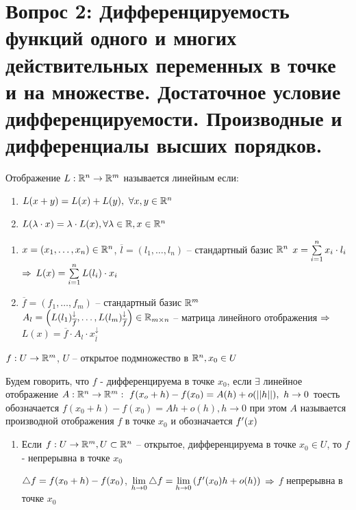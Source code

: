 \section{Вопрос 2: Дифференцируемость функций одного и многих действительных переменных
в точке и на множестве. Достаточное условие дифференцируемости.
Производные и дифференциалы высших порядков.}



\begin{defs}
	Отображение $L: \mathbb{R}^n\to\mathbb{R}^m$ называется линейным если:
	\begin{enumerate}
		\item $L(x+y)= L(x) + L(y), \ \forall x,y \in \mathbb{R}^n$
		\item $L(\lambda \cdot x) = \lambda \cdot L(x), \forall
		\lambda \in \mathbb{R},  x\in \mathbb{R}^n$
	\end{enumerate}

	\begin{enumerate}
		\item $x = (x_1, \ldots, x_n) \in \mathbb{R}^n$, $\overline{l} = (l_1,\ldots,l_n)$ -- стандартный базис $\mathbb{R}^n$ $x = \sum\limits_{i=1}^{n}x_i \cdot l_i$ $\Rightarrow$ $L(x) = \sum\limits_{i=1}^{n}L(l_i)\cdot x_i$

		\item $\overline{f}= (f_1,\ldots,f_m)$ -- стандартный базис $\mathbb{R}^m$ $A_l = \left( L(l_1)^{\downarrow}_{\overline{f}},\ldots,L(l_m)^{\downarrow}_{\overline{f}}\right) \in \mathbb{R}_{m \times n}$ -- матрица линейного отображения $\Rightarrow$ $L(x) = \overline{f} \cdot A_l \cdot x_{\overline{l}}^{\downarrow}$
	\end{enumerate}
\end{defs}

\begin{defs}
	$f: U \to \mathbb{R}^m$, $U$ -- открытое подмножество в $\mathbb{R}^n, x_0 \in U$

	Будем говорить, что $f$ - дифференцируема в точке $x_0$, если $\exists$ линейное отображение $A: \mathbb{R}^n \to \mathbb{R}^m: \ f(x_o + h) - f(x_0)= A(h) + o(\left|\left| h\right|\right|), \ h \to 0$ тоесть обозначается $f(x_0 + h)-f(x_0)=Ah+o(h), h\to 0$ при этом $A$ называется производной отображения $f$ в точке $x_0$ и обозначается $f^{\prime}(x)$
\end{defs}

\begin{claim}
	\begin{enumerate}
		\item Если $f: U \to \mathbb{R}^m, U \subset \mathbb{R}^n$ -- открытое, дифференцируема в точке $x_0 \in U$, то $f$ - непрерывна в точке $x_0$
		\begin{dokvo}
			$\bigtriangleup f = f(x_0 + h) - f(x_0)$, $\lim\limits_{h \to 0} \bigtriangleup f = \lim\limits_{h \to 0}\left( f^{\prime}(x_0)h + o(h)\right)$ $\Rightarrow$ $f$ непрерывна в точке $x_0$ 
		\end{dokvo}
	\end{enumerate}
\end{claim}
